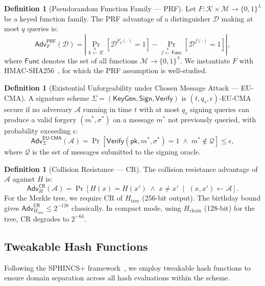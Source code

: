 \documentclass[11pt,a4paper]{article}
\theoremstyle{definition}
\newtheorem{definition}[theorem]{Definition}
\begin{document}
\begin{definition}[Pseudorandom Function Family --- PRF]
\label{def:prf}
Let $F : \mathcal{K} \times \mathcal{M} \to \{0,1\}^\lambda$ be a keyed function family. The PRF advantage of a distinguisher $\mathcal{D}$ making at most $q$ queries is:
$$
\mathsf{Adv}^{\mathsf{PRF}}_{F}(\mathcal{D}) = \left|
    \Pr_{k \xleftarrow{\$} \mathcal{K}}\left[\mathcal{D}^{F_k(\cdot)} = 1\right]
    - \Pr_{f \xleftarrow{\$} \mathsf{Func}}\left[\mathcal{D}^{f(\cdot)} = 1\right]
\right|,
$$
where $\mathsf{Func}$ denotes the set of all functions $\mathcal{M} \to \{0,1\}^\lambda$. We instantiate $F$ with HMAC-SHA256~\cite{rfc2104}, for which the PRF assumption is well-studied.
\end{definition}

\begin{definition}[Existential Unforgeability under Chosen Message Attack --- EU-CMA]
\label{def:eucma}
A signature scheme $\Sigma = (\mathsf{KeyGen}, \mathsf{Sign}, \mathsf{Verify})$ is $(t, q_s, \epsilon)$-EU-CMA secure if no adversary $\mathcal{A}$ running in time $t$ with at most $q_s$ signing queries can produce a valid forgery $(m^*, \sigma^*)$ on a message $m^*$ not previously queried, with probability exceeding $\epsilon$:
$$
\mathsf{Adv}^{\mathsf{EU\text{-}CMA}}_\Sigma(\mathcal{A}) = \Pr\left[
    \mathsf{Verify}(\mathsf{pk}, m^*, \sigma^*) = 1 \;\land\; m^* \notin \mathcal{Q}
\right] \leq \epsilon,
$$
where $\mathcal{Q}$ is the set of messages submitted to the signing oracle.
\end{definition}

\begin{definition}[Collision Resistance --- CR]
\label{def:cr}
The collision resistance advantage of $\mathcal{A}$ against $H$ is:
$$
\mathsf{Adv}^{\mathsf{CR}}_{H}(\mathcal{A}) = \Pr\left[
    H(x) = H(x') \;\land\; x \neq x'
    \;\middle|\;
    (x, x') \leftarrow \mathcal{A}
\right].
$$
For the Merkle tree, we require CR of $H_{\mathrm{tree}}$ (256-bit output). The birthday bound gives $\mathsf{Adv}^{\mathsf{CR}}_{H_{\mathrm{tree}}} \leq 2^{-128}$ classically. In compact mode, using $H_{\mathrm{chain}}$ (128-bit) for the tree, CR degrades to $2^{-64}$.
\end{definition}

\subsection{Tweakable Hash Functions}
\label{sec:tweakable}

Following the SPHINCS+ framework~\cite{bernstein2019sphincs}, we employ tweakable hash functions to ensure domain separation across all hash evaluations within the scheme.
\end{document}
